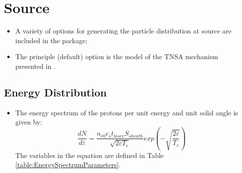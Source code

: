 \graphicspath{ {03-Source/Figures/} }

\section{Source}


\begin{itemize}
  \item A variety of options for generating the particle distribution
    at source are included in the package;
  \item The principle (default) option is the model of the TNSA
    mechanism presented in \cite{10.1038/nphys199}.
\end{itemize}


\subsection{Energy Distribution}

\begin{itemize}
  \item The energy spectrum of the protons per unit energy and unit
    solid angle is given by:
    \begin{equation}
      \frac{dN}{d\varepsilon} = \frac{n_{e0} c_{s} t_{laser} S_{sheath}}{\sqrt{2\varepsilon T_{e}}} exp(- \sqrt{\frac{2\varepsilon}{T_{e}}})
      \label{Eq:Spct:0}
    \end{equation}
    The variables in the equation are defined in Table \ref{table:EnergySpectrumParameters}.
  \end{itemize}
  

